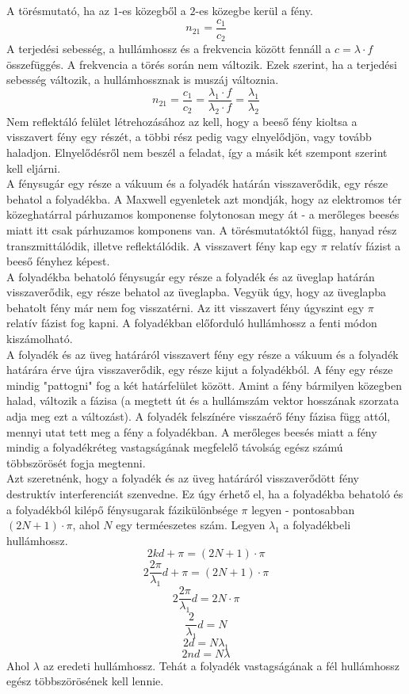 \documentclass[11pt,a4paper,openany,leqno]{article}
\begin{document}
\indent
A törésmutató, ha az $1$-es közegből a $2$-es közegbe kerül a fény.\\
$$ n_{21} = \frac{c_1}{c_2} $$
\indent
A terjedési sebesség, a hullámhossz és a frekvencia között fennáll a $c = \lambda \cdot f$ összefüggés. A frekvencia a törés során nem változik. Ezek szerint, ha a terjedési sebesség változik, a hullámhossznak is muszáj változnia.\\
$$ n_{21} = \frac{c_1}{c_2} = \frac{\lambda_1 \cdot f}{\lambda_2 \cdot f} = \frac{\lambda_1}{\lambda_2} $$\indent
Nem reflektáló felület létrehozásához az kell, hogy a beeső fény kioltsa a visszavert fény egy részét, a többi rész pedig vagy elnyelődjön, vagy tovább haladjon. Elnyelődésről nem beszél a feladat, így a másik két szempont szerint kell eljárni.\\ \indent
A fénysugár egy része a vákuum és a folyadék határán visszaverődik, egy része behatol a folyadékba. A Maxwell egyenletek azt mondják, hogy az elektromos tér közeghatárral párhuzamos komponense folytonosan megy át - a merőleges beesés miatt itt csak párhuzamos komponens van. A törésmutatóktól függ, hanyad rész transzmittálódik, illetve reflektálódik. A visszavert fény kap egy $\pi$ relatív fázist a beeső fényhez képest. \\ \indent
A folyadékba behatoló fénysugár egy része a folyadék és az üveglap határán visszaverődik, egy része behatol az üveglapba. Vegyük úgy, hogy az üveglapba behatolt fény már nem fog visszatérni. Az itt visszavert fény úgyszint egy $\pi$ relatív fázist fog kapni. A folyadékban előforduló hullámhossz a fenti módon kiszámolható.\\ \indent
A folyadék és az üveg határáról visszavert fény egy része a vákuum és a folyadék határára érve újra visszaverődik, egy része kijut a folyadékból. A fény egy része mindig "pattogni" fog a két határfelület között. Amint a fény bármilyen közegben halad, változik a fázisa (a megtett út és a hullámszám vektor hosszának szorzata adja meg ezt a változást). A folyadék felszínére visszaérő fény fázisa függ attól, mennyi utat tett meg a fény a folyadékban. A merőleges beesés miatt a fény mindig a folyadékréteg vastagságának megfelelő távolság egész számú többszörösét fogja megtenni.\\
\indent
Azt szeretnénk, hogy a folyadék és az üveg határáról visszaverődött fény destruktív interferenciát szenvedne. Ez úgy érhető el, ha a folyadékba behatoló és a folyadékból kilépő fénysugarak fázikülönbsége $\pi$ legyen - pontosabban $(2N+1) \cdot \pi$, ahol $N$ egy terméeszetes szám. Legyen $\lambda_1$ a folyadékbeli hullámhossz.\\
$$ 2kd + \pi = (2N+1) \cdot \pi $$
$$ 2\frac{2\pi}{\lambda_1}d + \pi = (2N+1) \cdot \pi $$
$$ 2\frac{2\pi}{\lambda_1}d = 2N \cdot \pi $$
$$ \frac{2}{\lambda_1}d = N $$
$$ 2d = N\lambda_1 $$
$$ 2nd = N\lambda $$
Ahol $\lambda$ az eredeti hullámhossz. Tehát a folyadék vastagságának a fél hullámhossz egész többszörösének kell lennie.
\end{document}
